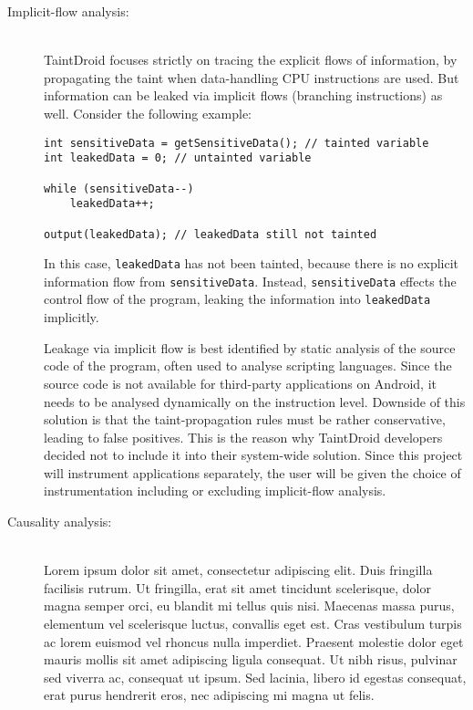 \documentclass[12pt]{article}
\begin{document}
\begin{description}
\item [Implicit-flow analysis:] \ \\
TaintDroid focuses strictly on tracing the explicit flows of information, 
by propagating the taint when data-handling CPU instructions are used. 
But information can be leaked via implicit flows (branching instructions) 
as well. Consider the following example:

\begin{verbatim}
int sensitiveData = getSensitiveData(); // tainted variable
int leakedData = 0; // untainted variable

while (sensitiveData--)
    leakedData++;

output(leakedData); // leakedData still not tainted
\end{verbatim}

In this case, \verb|leakedData| has not been tainted, because there is 
no explicit information flow from \verb|sensitiveData|. Instead, 
\verb|sensitiveData| effects the control flow of the program, leaking
the information into \verb|leakedData| implicitly. 

Leakage via implicit flow is best identified by static analysis of the 
source code of the program, often used to analyse scripting languages. 
Since the source code is not available for third-party applications on 
Android, it needs to be analysed dynamically on the instruction level.
Downside of this solution is that the taint-propagation rules must be
rather conservative, leading to false positives. This is the reason why
TaintDroid developers decided not to include it into their system-wide
solution. Since this project will instrument applications separately, 
the user will be given the choice of instrumentation including or 
excluding implicit-flow analysis.

\item [Causality analysis:] \ \\
Lorem ipsum dolor sit amet, consectetur adipiscing elit. Duis fringilla facilisis rutrum. Ut fringilla, erat sit amet tincidunt scelerisque, dolor magna semper orci, eu blandit mi tellus quis nisi. Maecenas massa purus, elementum vel scelerisque luctus, convallis eget est. Cras vestibulum turpis ac lorem euismod vel rhoncus nulla imperdiet. Praesent molestie dolor eget mauris mollis sit amet adipiscing ligula consequat. Ut nibh risus, pulvinar sed viverra ac, consequat ut ipsum. Sed lacinia, libero id egestas consequat, erat purus hendrerit eros, nec adipiscing mi magna ut felis.


\end{description}
\end{document}
